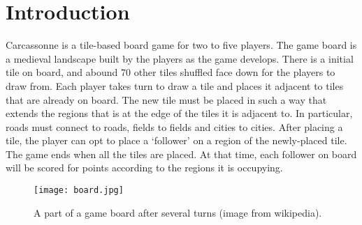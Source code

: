 \section{Introduction}
Carcassonne is a tile-based board game for two to five players.  The game board
is a medieval landscape built by the players as the game develops. There is a
initial tile on board, and abound 70 other tiles shuffled face down for the
players to draw from.  Each player takes turn to draw a tile and places it
adjacent to tiles that are already on board. The new tile must be placed in
such a way that extends the regions that is at the edge of the tiles it is
adjacent to.  In particular, roads must connect to roads, fields to fields and
cities to cities.  After placing a tile, the player can opt to place a
`follower' on a region of the newly-placed tile. The game ends when all the
tiles are placed.  At that time, each follower on board will be scored for
points according to the regions it is occupying. 
\begin{figure}[b]
\centering
\texttt{[image: board.jpg]}
\caption{A part of a game board after several turns (image from
wikipedia).}
\label{fig:board}
\end{figure}
